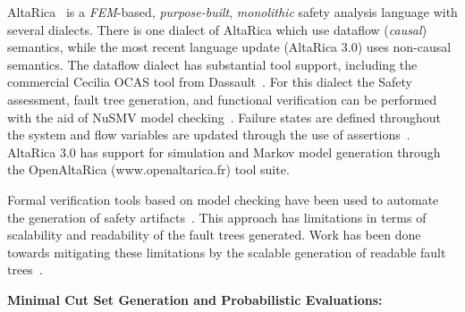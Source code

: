 AltaRica~\cite{PROSVIRNOVA2013127,BieberERTS2018} is a {\em FEM}-based, {\em purpose-built}, {\em monolithic} safety analysis language with several dialects.  There is one dialect of AltaRica which use dataflow ({\em causal}) semantics, while the most recent language update (AltaRica 3.0) uses non-causal semantics.  The dataflow dialect has substantial tool support, including the commercial Cecilia OCAS tool from Dassault~\cite{bieber2004safety}.  For this dialect the Safety assessment, fault tree generation, and functional verification can be performed with the aid of NuSMV model checking~\cite{symbAltaRica}. Failure states are defined throughout the system and flow variables are updated through the use of assertions~\cite{Bieber04safetyassessment}.  AltaRica 3.0 has support for simulation and Markov model generation through the OpenAltaRica (www.openaltarica.fr) tool suite.

Formal verification tools based on model checking have been used to automate the generation of safety artifacts~\cite{symbAltaRica,10.1007/978-3-540-75596-8-13, DBLP:conf/tacas/BittnerBCCGGMMZ16}. This approach has limitations in terms of scalability and readability of the fault trees generated. Work has been done towards mitigating these limitations by the scalable generation of readable fault trees~\cite{10.1007/978-3-319-11936-6-7}.

\textbf{Minimal Cut Set Generation and Probabilistic Evaluations:}



